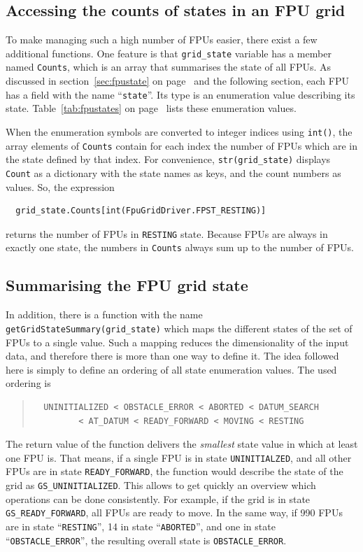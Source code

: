 \documentclass[11pt,a4paper]{report}
\begin{document}
\subsection{Accessing the counts of states in an FPU grid}
To make managing such a high number of FPUs easier, there exist a few
additional functions. One feature is that \texttt{grid\_state}
variable has a member named \texttt{Counts}, which is an array that
summarises the state of all FPUs. As discussed in
section~\ref{sec:fpustate} on page~\pageref{sec:fpustate} and the
following section, each FPU has a field with the name
``\texttt{state}''. Its type is an enumeration value describing its
state. Table~\ref{tab:fpustates} on page~\pageref{tab:fpustates} lists
these enumeration values.

When the enumeration symbols are converted to integer indices using
\texttt{int()}, the array elements of \texttt{Counts} contain for each
index the number of FPUs which are in the state defined by that
index. For convenience, \texttt{str(grid\_state)} displays
\texttt{Count} as a dictionary with the state names as keys, and the
count numbers as values. So, the expression
\begin{verbatim}
  grid_state.Counts[int(FpuGridDriver.FPST_RESTING)]
\end{verbatim}
returns the number of FPUs in \texttt{RESTING} state. Because FPUs are
always in exactly one state, the numbers in \texttt{Counts} always sum
up to the number of FPUs.

\subsection{Summarising the FPU grid state}
In addition, there is a function with the name
\texttt{getGridStateSummary(grid\_state)} which maps the different
states of the set of FPUs to a single value. Such a mapping reduces
the dimensionality of the input data, and therefore there is more than
one way to define it. The idea followed here is simply to define an
ordering of all state enumeration values. The used ordering is
\begin{quote}
\begin{verbatim}
  UNINITIALIZED < OBSTACLE_ERROR < ABORTED < DATUM_SEARCH
         < AT_DATUM < READY_FORWARD < MOVING < RESTING
\end{verbatim}
\end{quote}

The return value of the function delivers the \emph{smallest} state
value in which at least one FPU is.  That means, if a single FPU is in
state \texttt{UNINITIALZED}, and all other FPUs are in state
\texttt{READY\_FORWARD}, the function would describe the state of the
grid as \texttt{GS\_UNINITIALIZED}. This allows to get quickly an
overview which operations can be done consistently. For example, if
the grid is in state \texttt{GS\_READY\_FORWARD}, all FPUs are ready
to move. In the same way, if 990 FPUs are in state ``\texttt{RESTING}'',
14 in state ``\texttt{ABORTED}'', and one in state ``\texttt{OBSTACLE\_ERROR}'',
the resulting overall state is \texttt{OBSTACLE\_ERROR}.
\end{document}
